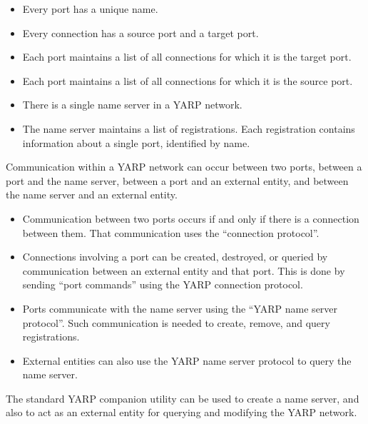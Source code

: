 \documentclass[a4]{article}
\newcommand{\pflist}
  {     \renewcommand{\labelitemi}{$\triangleright$}
        \setlength{\itemsep}{0mm}
        \setlength{\parsep}{0mm}
        \setlength{\partopsep}{0mm}
        \setlength{\topsep}{0mm}
        \setlength{\parskip}{0mm}    }
\begin{document}
\begin{itemize} \pflist

\item Every port has a unique name.

\item Every connection has a source port and a target port.

\item Each port maintains a list of all connections for which it
is the target port.

\item Each port maintains a list of all connections for which it
is the source port.

\item There is a single name server in a YARP network.

\item The name server maintains a list of registrations.  Each 
registration contains information about a single port, identified
by name.

\end{itemize}


\noindent
Communication within a YARP network can occur between two ports,
between a port and the name server, between a port and an
external entity, and between the name server and an external entity.


\begin{itemize} \pflist

\item Communication between two ports occurs if and only if there
is a connection between them.  That communication uses the
``connection protocol''.

\item Connections involving a port can be created, destroyed, or
queried by communication between an external entity and that port.
This is done by sending ``port commands'' using the YARP
connection protocol.

\item Ports communicate with the name server using the 
``YARP name server protocol''.  Such communication is needed
to create, remove, and query registrations.

\item External entities can also use the YARP name server protocol
to query the name server.

\end{itemize}

\noindent
The standard YARP companion utility can be used to create a
name server, and also to act as an external entity for querying and
modifying the YARP network.
\end{document}
